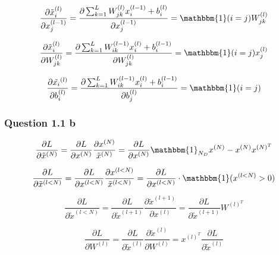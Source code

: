 \documentclass{article}
\begin{document}
\begin{equation}
\frac{\partial \tilde{x}_i^{(l)} }{\partial x_j^{(l-1)}} = 
\frac{\partial \sum_{k=1}^L W_{jk}^{(l)} x_i^{(l-1)} + b_i^{(l)} }{\partial x_j^{(l-1)}} =  \mathbbm{1}(i=j) W_{jk}^{(l)}
\end{equation}

\begin{equation}
\frac{\partial \tilde{x}_i^{(l)}}{\partial W_{jk}^{(l)}} = 
\frac{\partial \sum_{k=1}^L W_{ik}^{(l-1)} x_i^{(l)} + b_i^{(l-1)}}{\partial W_{jk}^{(l)}} = \mathbbm{1}(i=j) x_j^{(l)}
\end{equation}

\begin{equation}
\frac{\partial \tilde{x_i}^{(l)} }{\partial b_i^{(l)}} = 
\frac{\partial \sum_{k=1}^L W_{ik}^{(l-1)} x_i^{(l)} + b_i^{(l-1)}}{\partial b_j^{(l)}} = \mathbbm{1}(i=j)
\end{equation}

\subsubsection*{Question 1.1 b}
\begin{equation}
	\frac{\partial L}{\partial \tilde{x}^{(N)}} = \frac{\partial L}{\partial x^{(N)}} \frac{\partial x^{(N)}}{\tilde{x}^{(N)}} = \frac{\partial L}{\partial x^{(N)}} \mathbbm{1}_{N_D}x^{(N)} - x^{(N)}x^{(N)^T}
\end{equation}


\begin{equation}
	\frac{\partial L}{\partial \tilde{x}^{(l<N)}} = \frac{\partial L}{\partial x^{(l<N)}} \frac{\partial x^{(l<N)}}{\tilde{x}^{(l<N)}} = \frac{\partial L}{\partial x^{(l<N)}} \cdot \mathbbm{1} (x^{(l<N)} > 0)
\end{equation}

\begin{equation}
	\frac{\partial L}{\partial \tilde{x}^{(l<N)}} = \frac{\partial L}{\partial \tilde{x}^{(l+1)}}\frac{\partial \tilde{x}^{(l+1)}}{\partial x^{(l)}}
	= \frac{\partial L}{\partial \tilde{x}^{(l+1)}} W^{(l)^T}
\end{equation}



\begin{equation}
	\frac{\partial L}{\partial W^{(l)}} = \frac{\partial L}{\partial \tilde{x}^{(l)}}\frac{\partial \tilde{x}^{(l)}}{\partial W^{(l)}}
	= x^{(l)^T}\frac{\partial L}{\partial \tilde{x}^{(l)}} 
\end{equation}
\end{document}
